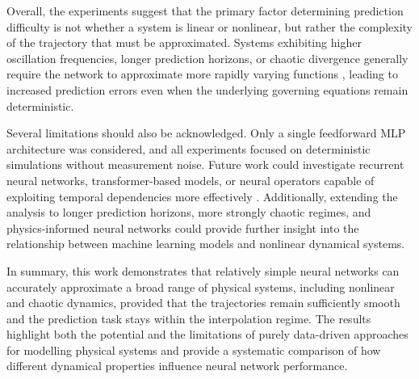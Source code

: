 Overall, the experiments suggest that the primary factor determining prediction difficulty is not whether a system is linear or nonlinear, but rather the complexity of the trajectory that must be approximated. Systems exhibiting higher oscillation frequencies, longer prediction horizons, or chaotic divergence generally require the network to approximate more rapidly varying functions \cite{spectralbias2024}, leading to increased prediction errors even when the underlying governing equations remain deterministic.

Several limitations should also be acknowledged. Only a single feedforward MLP architecture was considered, and all experiments focused on deterministic simulations without measurement noise. Future work could investigate recurrent neural networks, transformer-based models, or neural operators capable of exploiting temporal dependencies more effectively \cite{hochreiter1997long,cho2014learning}. Additionally, extending the analysis to longer prediction horizons, more strongly chaotic regimes, and physics-informed neural networks could provide further insight \cite{raissi2019physics} into the relationship between machine learning models and nonlinear dynamical systems.

In summary, this work demonstrates that relatively simple neural networks can accurately approximate a broad range of physical systems, including nonlinear and chaotic dynamics, provided that the trajectories remain sufficiently smooth and the prediction task stays within the interpolation regime. The results highlight both the potential and the limitations of purely data-driven approaches for modelling physical systems and provide a systematic comparison of how different dynamical properties influence neural network performance.
